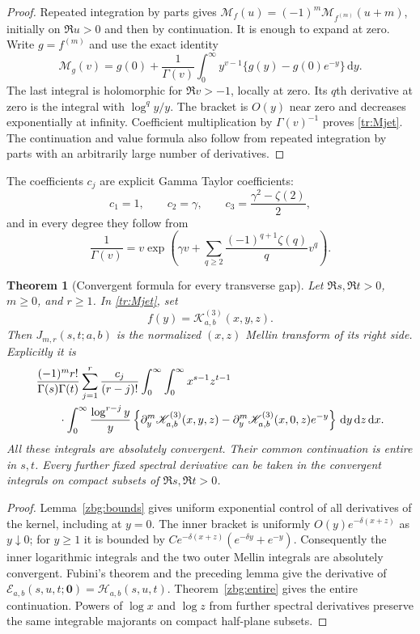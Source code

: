 \documentclass[11pt,letterpaper]{article}
\numberwithin{equation}{section}
\theoremstyle{plain}
\newtheorem{theorem}{Theorem}[section]
\theoremstyle{definition}
\theoremstyle{remark}
\newcommand{\dd}{\,\mathrm d}
\newcommand{\HH}{\mathcal H}
\begin{document}
\begin{proof}
Repeated integration by parts gives
$\mathcal M_f(u)=(-1)^m\mathcal M_{f^{(m)}}(u+m)$, initially on
$\Re u>0$ and then by continuation. It is enough to expand at zero.
Write $g=f^{(m)}$ and use the exact identity
\[
 \mathcal M_g(v)=g(0)+\frac1{\Gamma(v)}
       \int_0^\infty y^{v-1}\{g(y)-g(0)e^{-y}\}\dd y .
\]
The last integral is holomorphic for $\Re v>-1$, locally at zero.
Its $q$th derivative at zero is the integral with
$\log^qy/y$. The bracket is $O(y)$ near zero and decreases
exponentially at infinity. Coefficient multiplication by
$\Gamma(v)^{-1}$ proves \eqref{tr:Mjet}.
The continuation and value formula also follow from repeated integration
by parts with an arbitrarily large number of derivatives.
\end{proof}

The coefficients $c_j$ are explicit Gamma Taylor coefficients:
\[
 c_1=1,\qquad c_2=\gamma,\qquad
 c_3=\frac{\gamma^2-\zeta(2)}2,
\]
and in every degree they follow from
\[
 \frac1{\Gamma(v)}
     =v\exp\left(\gamma v+
             \sum_{q\geq2}\frac{(-1)^{q+1}\zeta(q)}qv^q\right).
\]

\begin{theorem}[Convergent formula for every transverse gap]
\label{tr:integral}
Let $\Re s,\Re t>0$, $m\geq0$, and $r\geq1$. In
\eqref{tr:Mjet}, set
\[
 f(y)=\mathscr K_{a,b}^{(3)}(x,y,z).
\]
Then $J_{m,r}(s,t;a,b)$ is the normalized $(x,z)$ Mellin transform
of its right side. Explicitly it is
\begin{align}
 &\frac{(-1)^m r!}{\Gamma(s)\Gamma(t)}
 \sum_{j=1}^r\frac{c_j}{(r-j)!}
 \int_0^\infty\int_0^\infty
       x^{s-1}z^{t-1}\notag\\
 &\qquad\cdot\int_0^\infty \frac{\log^{r-j}y}{y}
 \left\{\partial_y^m\mathscr K^{(3)}_{a,b}(x,y,z)
       -\partial_y^m\mathscr K^{(3)}_{a,b}(x,0,z)e^{-y}\right\}
             \dd y\dd z\dd x .
 \label{tr:tripleintegral}
\end{align}
All these integrals are absolutely convergent. Their common continuation
is entire in $s,t$. Every further fixed spectral derivative can be
taken in the convergent integrals on compact subsets of
$\Re s,\Re t>0$.
\end{theorem}

\begin{proof}
Lemma~\ref{zbg:bounds} gives uniform exponential control of all derivatives
of the kernel, including at $y=0$. The inner bracket is uniformly
$O(y)e^{-\delta(x+z)}$ as $y\downarrow0$; for $y\geq1$ it is bounded
by $Ce^{-\delta(x+z)}(e^{-\delta y}+e^{-y})$.
Consequently the inner logarithmic integrals and the two outer Mellin
integrals are absolutely convergent. Fubini's theorem and the preceding
lemma give the derivative of
$\mathscr E_{a,b}(s,u,t;\boldsymbol0)=\HH_{a,b}(s,u,t)$.
Theorem~\ref{zbg:entire} gives the entire continuation. Powers of $\log x$
and $\log z$ from further spectral derivatives preserve the same
integrable majorants on compact half-plane subsets.
\end{proof}
\end{document}
